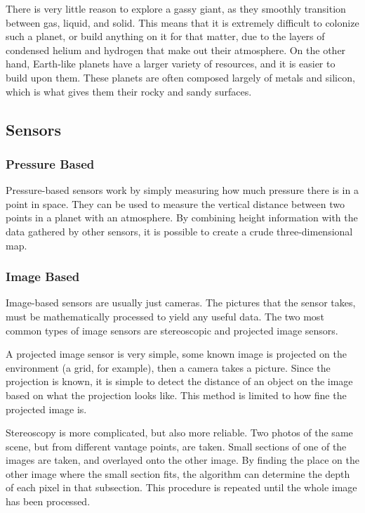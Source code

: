 There is very little reason to explore a gassy giant, as they smoothly transition between gas, liquid, and solid. This means that it is extremely difficult to colonize such a planet, or build anything on it for that matter, due to the layers of condensed helium and hydrogen that make out their atmosphere\cite{outerplanetatmosphere}.
On the other hand, Earth-like planets have a larger variety of resources, and it is easier to build upon them. These planets are often composed largely of metals and silicon, which is what gives them their rocky and sandy surfaces.

\subsection{Sensors}
\subsubsection{Pressure Based}
Pressure-based sensors work by simply measuring how much pressure there is in a point in space. They can be used to measure the vertical distance between two points in a planet with an atmosphere\cite{barometric1}\cite{barometric2}. By combining height information with the data gathered by other sensors, it is possible to create a crude three-dimensional map.

\subsubsection{Image Based}
Image-based sensors are usually just cameras. %
 The pictures that the sensor takes, must be mathematically processed to yield any useful data. The two most common types of image sensors are stereoscopic and projected image sensors.

A projected image sensor is very simple, %
 some known image is projected on the environment (a grid, for example), then a camera takes a picture. Since the projection is known, it is simple to detect the distance of an object on the image based on what the projection looks like. This method is limited to how fine the projected image is. %

Stereoscopy is more complicated, but also more reliable. Two photos of the same scene, but from different vantage points, are taken. Small sections of one of the images are taken, and overlayed onto the other image. By finding the place on the other image where the small section fits, the algorithm can determine the depth of each pixel in that subsection. This procedure is repeated until the whole image has been processed.

